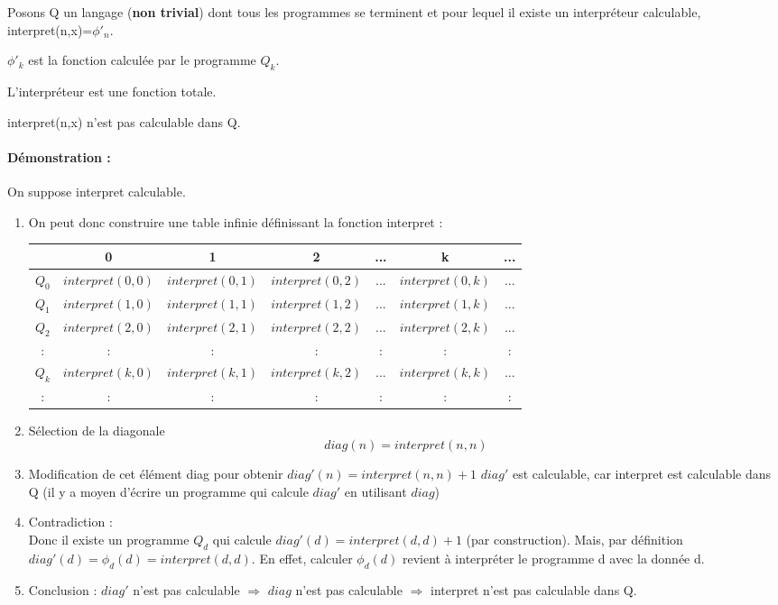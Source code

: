 \begin{mydef}
	Posons Q un langage (\textbf{non trivial}) dont tous les programmes se terminent et pour 
	lequel il existe un interpréteur calculable, interpret(n,x)=$\phi'_n$.
\end{mydef}
	
\begin{mydef}
	$\phi'_k$ est la fonction calculée par le programme $Q_k$.
\end{mydef}

\begin{myprop}
	 L'interpréteur est une fonction totale.
\end{myprop}

\begin{mytheo}
	\label{Hoare_Allison}
	interpret(n,x) n'est pas calculable dans Q.\\
\end{mytheo}

\paragraph{Démonstration :}
On suppose interpret calculable. 
\begin{enumerate}
	\item On peut donc construire une table infinie définissant la fonction
		interpret : \\
		\begin{tabular}{|c||c|c|c|c|c|c|}
			\hline
			& 0 & 1 & 2 & ... & k & ... \\
			\hline
			$Q_0$ & $interpret(0,0)$ & $interpret(0,1)$ & $interpret(0,2)$ & ... & $interpret(0,k)$ & ... \\
			$Q_1$ & $interpret(1,0)$ & $interpret(1,1)$ & $interpret(1,2)$ & ... & $interpret(1,k)$ & ... \\
			$Q_2$ & $interpret(2,0)$ & $interpret(2,1)$ & $interpret(2,2)$ & ... & $interpret(2,k)$ & ... \\
			: & : &:& : & : & : &:\\
			$Q_k$ & $interpret(k,0)$ & $interpret(k,1)$ & $interpret(k,2)$ & ... & $interpret(k,k)$ & ... \\
			: & : &:& : & : & : &:\\
			\hline
		\end{tabular}
	\item Sélection de la diagonale 
		\[diag(n) = interpret(n,n)\]
	\item Modification de cet élément diag pour obtenir
		$diag'(n) = interpret(n,n)+1$ 
		$diag'$ est calculable, car interpret est calculable dans Q (il y a moyen
		d'écrire un programme qui calcule $diag'$ en utilisant $diag$)
	\item Contradiction :\\
	       	Donc il existe un programme $Q_d$ qui calcule
		$diag'(d) = interpret(d,d)+1$ (par construction).
		Mais, par définition $diag'(d) = \phi_d(d) = interpret(d,d)$.
		En effet, calculer $\phi_d(d)$ revient à interpréter le programme
		d avec la donnée d.
	\item Conclusion : $diag'$ n'est pas calculable $ \Rightarrow $ $diag$
	n'est pas calculable $ \Rightarrow $ interpret n'est pas calculable
dans Q.
\end{enumerate}


